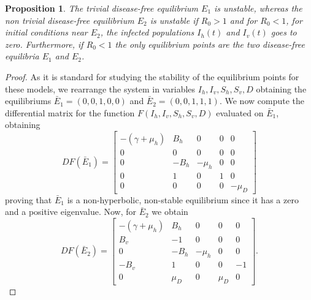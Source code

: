 \documentclass{amsart}
\newtheorem{prop}[thm]{Proposition}
\theoremstyle{definition}
\theoremstyle{remark}
\numberwithin{equation}{section}
\begin{document}
\begin{prop}\label{local stability}
The trivial disease-free equilibrium $E_1$ is unstable, whereas the non trivial disease-free equilibrium $E_2$ is unstable if $R_0 > 1$ and for $R_0 < 1$, for initial conditions near ${E}_2$,
 the infected populations $I_h(t)$ and $I_v(t)$ goes to zero. Furthermore, if $R_0<1$ the only equilibrium points are the two disease-free equilibria $E_1$ and $E_2$.
\end{prop}
\begin{proof}
As it is standard for studying the stability of the equilibrium points for these models, we rearrange the system in variables $I_h,I_v,S_h,S_v,D$ obtaining the equilibriums 
$\bar{E}_1=(0,0,1,0,0)$ and  $\bar{E}_2=(0,0,1,1,1)$.
We now  compute the  differential matrix for the function $F(I_h,I_v,S_h,S_v,D)$ evaluated on $\bar{E}_1$, obtaining
$$
DF(\bar{E}_1) =
\begin{bmatrix}
	-(\gamma + \mu_h) & B_h & 0 & 0& 0 \\
	0  & 0 & 0 & 0 & 0 \\
	0 & -B_h & -\mu_h & 0 & 0 \\
	0& 1&0 & 1 &  0 \\
	0 &  0 & 0 & 0 & -\mu_D
\end{bmatrix}
$$ 
proving that $\bar{E}_1$ is a non-hyperbolic, non-stable equilibrium since it has a zero and a positive eigenvalue. Now, for $\bar{E}_2$ we obtain
$$
DF(\bar{E}_2) =
\begin{bmatrix}
-(\gamma + \mu_h) & B_h & 0 & 0& 0 \\
B_v  & -1 & 0 & 0 & 0 \\
0 & -B_h & -\mu_h & 0 & 0 \\
-B_v& 1&0 & 0&  - 1 \\
0 &  \mu_D & 0 & \mu_D & 0
\end{bmatrix}.
$$


\end{proof}
\end{document}
